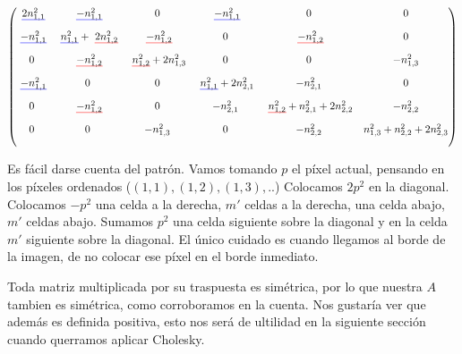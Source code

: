 \setul{5pt}{2pt}
\[
\begin{pmatrix}
    \text{\setulcolor{blue} \ul{$2 n_{1,1}^{2}$}}  &  \text{\setulcolor{blue} \ul{$ -n_{1,1}^{2} $}}   &  0        & \text{\setulcolor{blue} \ul{$-n_{1,1}^{2} $}}   & 0         & 0            \\[10pt]

    \text{\setulcolor{blue} \ul{$-n_{1,1}^{2}$}} &  \text{\setulcolor{blue} \ul{$n_{1,1}^{2}$}} +                                \text{\setulcolor{red} \ul{$2 n_{1,2}^{2}$}}   &  \text{\setulcolor{red} \ul{$-n_{1,2}^{2}$}}        & 0     & \text{\setulcolor{red} \ul{$-n_{1,2}^{2}$}}         & 0            \\[10pt]

    0          &  \text{\setulcolor{red} \ul{$-n_{1,2}^{2}$}}  &  \text{\setulcolor{red} \ul{$n_{1,2}^{2}$}} + 2 n_{1,3}^{2} &   0   & 0  & -n_{1,3}^{2}            \\[10pt]

    \text{\setulcolor{blue} \ul{$-n_{1,1}^{2}$}} &  0            &  0           & \text{\setulcolor{blue} \ul{$n_{1,1}^{2}$}} + 2 n_{2,1}^{2} & -n_{2,1}^{2}    & 0            \\[10pt]

    0          &   \text{\setulcolor{red} \ul{$-n_{1,2}^{2}$}} & 0           & -n_{2,1}^{2}                & \text{\setulcolor{red} \ul{$n_{1,2}^{2}$}} + n_{2,1}^{2} + 2 n_{2,2}^{2}    &      -n_{2,2}^{2}  \\[10pt]

    0          &              0&  -n_{1,3}^{2} & 0                          & - n_{2,2}^{2} & n_{1,3}^{2} + n_{2,2}^{2} + 2 n_{2,3}^{2}             \\[10pt]

\end{pmatrix}
\]

Es fácil darse cuenta del patrón. Vamos tomando $p$ el píxel actual, pensando en los píxeles ordenados ($(1,1), (1,2), (1,3), .. $) Colocamos $2p^2$ en la diagonal. Colocamos $-p^2$ una celda a la derecha, $m'$ celdas a la derecha, una celda abajo, $m'$ celdas abajo. Sumamos $p^2$ una celda siguiente sobre la diagonal y en la celda $m'$ siguiente sobre la diagonal. El único cuidado es cuando llegamos al borde de la imagen, de no colocar ese píxel en el borde inmediato.

Toda matriz multiplicada por su traspuesta es simétrica, por lo que nuestra $A$ tambien es simétrica, como corroboramos en la cuenta. Nos gustaría ver que además es definida positiva, esto nos será de ultilidad en la siguiente sección cuando querramos aplicar Cholesky. \\

